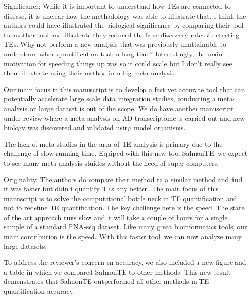 \documentclass[10pt]{article}
\begin{document}
\begin{response}{Significance: While it is important to understand how TEs are connected to disease, it is unclear how the methodology was able to illustrate that. I think the authors could have illustrated the biological significance by comparing their tool to another tool and illustrate they reduced the false discovery rate of detecting TEs. Why not perform a new analysis that was previously unattainable to understand when quantification took a long time? Interestingly, the main motivation for speeding things up was so it could scale but I don’t really see them illustrate using their method in a big meta-analysis. }


    Our main focus in this manuscript is to develop a fast yet accurate tool that can potentially accelerate large scale data integration studies,  conducting a meta-analysis  
     on large dataset is out of the scope.  We do have another manuscript under-review where a meta-analysis on AD transcriptome is carried out and new biology was discovered and validated using model organisms.  

The lack of meta-studies in the area of TE analysis is primary due to the challenge of slow running time.  Equiped  with this new tool SalmonTE, we expect to see many meta analysis stuides without the need of super computers. 
\end{response}

\begin{response}{Originality: The authors do compare their method to a similar method and find it was faster but didn’t quantify TEs any better.}
The main focus of this manuscript is to solve the computational bottle neck in TE quantification and not to redefine TE quantification.
The key challenge here is the speed.  The state of the art approach runs slow and it will take a couple of hours for a single sample of a standard RNA-seq dataset. 
Like many great bioinformatics tools, our main contribution is the speed.  With this faster tool, we can now analyze many large datasets. 

To address the reviewer's concern on accuracy, we also included a new figure and a table in which we compared SalmonTE to other methods.  
This new result demonstrates that SalmonTE outperformed all other methods in TE quantification accuracy. 
\end{response}
\end{document}
